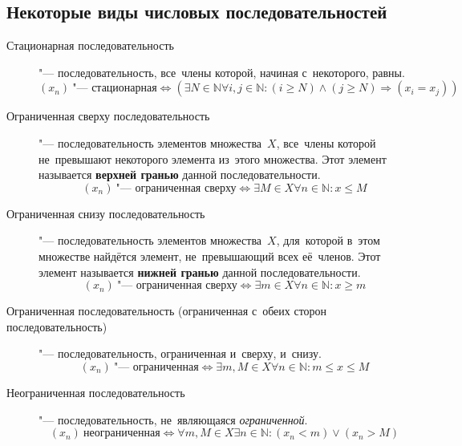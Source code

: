 \documentclass[]{scrartcl}
\begin{document}
\subsection{Некоторые виды числовых последовательностей}
\begin{description}
	\item[Стационарная последовательность] "--- последовательность, все~члены которой, начиная с~некоторого, равны.
	\begin{equation}\label{eq:stational-sequence}
	(x_n)\ \text{"--- стационарная} \Leftrightarrow (\exists N \in \mathbb{N} \forall i,j \in \mathbb{N}: (i\geq N)\wedge(j\geq N)\Rightarrow(x_i=x_j))
	\end{equation}
	\item[Ограниченная сверху последовательность] "--- последовательность элементов множества~${\textstyle X}$, все~члены которой не~превышают некоторого элемента из~этого множества. Этот элемент называется \textbf{верхней гранью} данной последовательности.
	\begin{equation}\label{eq:sequence-with-top-limit}
	(x_n)\ \text{"--- ограниченная сверху} \Leftrightarrow \exists M \in X \forall n \in \mathbb{N}: x \leq M
	\end{equation}
	\item[Ограниченная снизу последовательность] "--- последовательность элементов множества~${\textstyle X}$, для~которой в~этом множестве найдётся элемент, не~превышающий всех её~членов. Этот элемент называется \textbf{нижней гранью} данной последовательности.
	\begin{equation}\label{eq:sequence-with-bottom-limit}
	(x_n)\ \text{"--- ограниченная сверху} \Leftrightarrow \exists m \in X \forall n \in \mathbb{N}: x \geq m
	\end{equation}
	\item[Ограниченная последовательность (ограниченная с~обеих сторон последовательность)] "--- последовательность, ограниченная и~сверху, и~снизу.
	\begin{equation}\label{eq:sequence-with-top-bottom-limit}
	(x_n)\ \text{"--- ограниченная} \Leftrightarrow \exists m,M \in X \forall n \in \mathbb{N}: m \leq x \leq M
	\end{equation}
	\item[Неограниченная последовательность] "--- последовательность, не~являющаяся \emph{ограниченной}.
	\begin{equation}\label{eq:sequence-with-no-limit}
	(x_n)\ \text{неограниченная} \Leftrightarrow \forall m,M \in X \exists n \in \mathbb{N}:(x_n<m) \vee (x_n>M)
	\end{equation}
\end{description}
\end{document}
